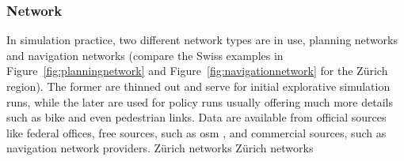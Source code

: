 \subsubsection{Network}
%
%
In simulation practice, two different network types are in use, planning networks and navigation networks (compare the Swiss examples in Figure~\ref{fig:planningnetwork} and Figure~\ref{fig:navigationnetwork} for the Zürich region). The former are thinned out and serve for initial explorative simulation runs, while the later are used for policy runs usually offering much more details such as bike and even pedestrian links. Data are available from official sources like federal offices, free sources, such as \gls{osm} \citep[][]{OpenStreetMap_Webpage_2015}, and commercial sources, such as navigation network providers.
%
\createfigure%
{Zürich networks}%
{Zürich networks}%
{\label{fig:zhnetwork}}%
